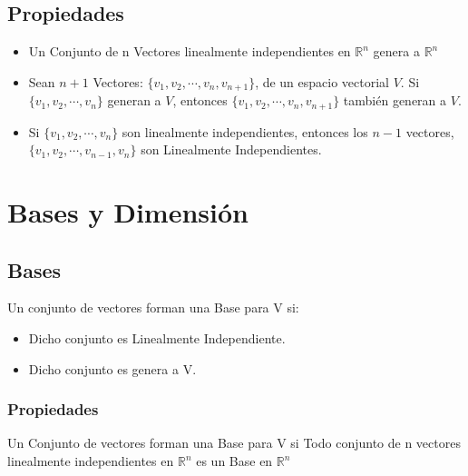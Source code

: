 \documentclass[12pt]{report}							    %
\begin{document}
        \subsection{Propiedades}
        \begin{itemize}
            \item Un Conjunto de n Vectores linealmente independientes en
            $\mathbb{R}^n$ genera a $\mathbb{R}^n$

            \item Sean $n+1$ Vectores: $\{ v_1, v_2, \cdots, v_n, v_{n+1} \}$, 
            de un espacio vectorial $V$. Si $\{ v_1, v_2, \cdots, v_n \}$ generan a $V$,
            entonces $\{ v_1, v_2, \cdots, v_n, v_{n+1} \}$ también generan a $V$.

            \item Si $\{ v_1, v_2, \cdots, v_n \}$ son linealmente independientes,
            entonces los $n-1$ vectores, $\{v_1, v_2, \cdots, v_{n-1}, v_n \}$ son
            Linealmente Independientes.

        \end{itemize}

    \clearpage
    \section{Bases y Dimensión}

        \subsection{Bases}
        Un conjunto de vectores forman una Base para V si:
        \begin{itemize}
            \item Dicho conjunto es Linealmente Independiente.

            \item Dicho conjunto es genera a V.
        \end{itemize}

        \subsubsection{Propiedades}
        Un Conjunto de vectores forman una Base para V si Todo conjunto de n vectores
        linealmente independientes en $\mathbb{R}^n$ es un Base en $\mathbb{R}^n$
\end{document}
